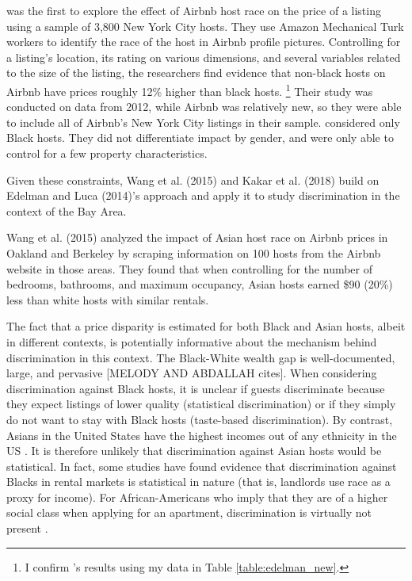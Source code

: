 \cite{edelman} was the first to explore the effect of Airbnb host race on the price of a listing using a sample of 3,800 New York City hosts. They use Amazon Mechanical Turk workers to identify the race of the host in Airbnb profile pictures. Controlling for a listing's location, its rating on various dimensions, and several variables related to the size of the listing, the researchers find evidence that non-black hosts on Airbnb have prices roughly 12\% higher than black hosts.%
	\footnote{I confirm \cite{edelman}’s results using my data in Table \ref{table:edelman_new}.} 
Their study was conducted on data from 2012, while Airbnb was relatively new, so they were able to include all of Airbnb's New York City listings in their sample. \cite{edelman} considered only Black hosts. They did not differentiate impact by gender, and were only able to control for a few property characteristics. 

Given these constraints, Wang et al. (2015) and Kakar et al. (2018) build on Edelman and Luca (2014)’s approach and apply it to study discrimination in the context of the Bay Area. 

Wang et al. (2015) analyzed the impact of Asian host race on Airbnb prices in Oakland and Berkeley by scraping information on 100 hosts from the Airbnb website in those areas. They found that when controlling for the number of bedrooms, bathrooms, and maximum occupancy, Asian hosts earned \$90 (20\%) less than white hosts with similar rentals. 

The fact that a price disparity is estimated for both Black and Asian hosts, albeit in different contexts, is potentially informative about the mechanism behind discrimination in this context. The Black-White wealth gap is well-documented, large, and pervasive [MELODY AND ABDALLAH cites]. When considering discrimination against Black hosts, it is unclear if guests discriminate because they expect listings of lower quality (statistical discrimination) or if they simply do not want to stay with Black hosts (taste-based discrimination). By contrast, Asians in the United States have the highest incomes out of any ethnicity in the US \citep{income}. It is therefore unlikely that discrimination against Asian hosts would be statistical. In fact, some studies have found evidence that discrimination against Blacks in rental markets is statistical in nature (that is, landlords use race as a proxy for income). For African-Americans who imply that they are of a higher social class when applying for an apartment, discrimination is virtually not present \citep{hanson}.




